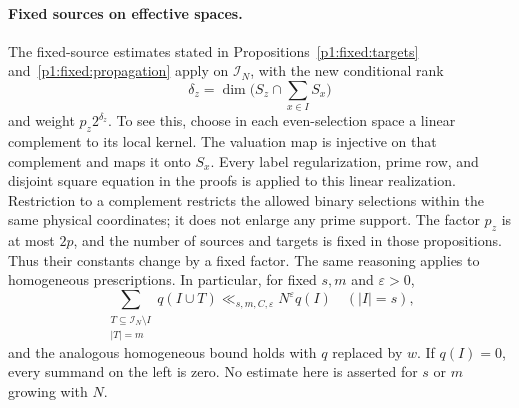 \paragraph{Fixed sources on effective spaces.}
The fixed-source estimates stated in
Propositions~\ref{p1:fixed:targets} and~\ref{p1:fixed:propagation}
apply on
\(\mathcal I_N\), with the new conditional rank
\[
 \delta_z=\dim\bigl(S_z\cap\textstyle\sum_{x\in I}S_x\bigr)
\]
and weight \(p_z2^{\delta_z}\). To see this, choose in each
even-selection space a linear complement to its local kernel.
The valuation map is injective on that complement and maps it
onto \(S_x\). Every label regularization, prime row, and disjoint
square equation in the proofs is applied to this linear
realization. Restriction to a complement restricts the allowed
binary selections within the same physical coordinates; it does
not enlarge any prime support.
The factor \(p_z\) is at most \(2p\), and the number of sources
and targets is fixed in those propositions. Thus their constants
change by a fixed factor. The same reasoning applies to
homogeneous prescriptions. In particular, for fixed \(s,m\) and
\(\varepsilon>0\),
\begin{equation}
 \sum_{\substack{T\subseteq\mathcal I_N\setminus I\\|T|=m}}
       q(I\cup T)\ll_{s,m,C,\varepsilon}N^\varepsilon q(I)
 \quad (|I|=s),
 \label{p13:exact:propagation}
\end{equation}
and the analogous homogeneous bound holds with \(q\) replaced
by \(w\). If \(q(I)=0\), every summand on the left is zero.
No estimate here is asserted for \(s\) or \(m\) growing with \(N\).
